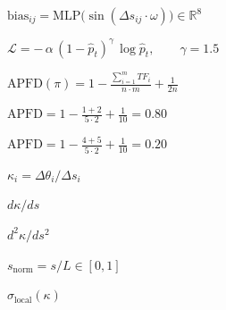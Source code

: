\documentclass{article}
\begin{document}
\begin{preview}
$\mathrm{bias}_{ij} = \mathrm{MLP}\bigl(\sin(\Delta s_{ij}\cdot\omega)\bigr) \in \mathbb{R}^{8}$
\end{preview}

\begin{preview}
$\mathcal{L} = -\,\alpha\,(1-\hat{p}_t)^{\gamma}\,\log \hat{p}_t, \qquad \gamma = 1.5$
\end{preview}

\begin{preview}
$\displaystyle \mathrm{APFD}(\pi) = 1 - \frac{\sum_{i=1}^{m} TF_i}{n\cdot m} + \frac{1}{2n}$
\end{preview}

\begin{preview}
$\displaystyle \mathrm{APFD} = 1 - \frac{1+2}{5\cdot 2} + \frac{1}{10} = \mathbf{0.80}$
\end{preview}

\begin{preview}
$\displaystyle \mathrm{APFD} = 1 - \frac{4+5}{5\cdot 2} + \frac{1}{10} = \mathbf{0.20}$
\end{preview}

\begin{preview}
$\kappa_i = \Delta\theta_i / \Delta s_i$
\end{preview}

\begin{preview}
$d\kappa/ds$
\end{preview}

\begin{preview}
$d^2\kappa/ds^2$
\end{preview}

\begin{preview}
$s_{\text{norm}} = s/L \in [0,1]$
\end{preview}

\begin{preview}
$\sigma_{\text{local}}(\kappa)$
\end{preview}
\end{document}
